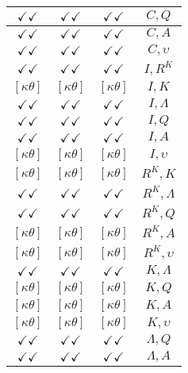 \documentclass[a4paper,10pt]{article}
\begin{document}
\begin{longtable}{|c|c|c|c|}
\hline
$\checkmark\checkmark$ & $\checkmark\checkmark$ & $\checkmark\checkmark$ & ${C},{Q}$ \\
\hline
$\checkmark\checkmark$ & $\checkmark\checkmark$ & $\checkmark\checkmark$ & ${C},{A}$ \\
\hline
$\checkmark\checkmark$ & $\checkmark\checkmark$ & $\checkmark\checkmark$ & ${C},{\upsilon}$ \\
\hline
$\checkmark\checkmark$ & $\checkmark\checkmark$ & $\checkmark\checkmark$ & ${I},{R^{K}}$ \\
\hline
$[\kappa \theta ]$ & $[\kappa \theta ]$ & $[\kappa \theta ]$ & ${I},{K}$ \\
\hline
$\checkmark\checkmark$ & $\checkmark\checkmark$ & $\checkmark\checkmark$ & ${I},{\Lambda}$ \\
\hline
$\checkmark\checkmark$ & $\checkmark\checkmark$ & $\checkmark\checkmark$ & ${I},{Q}$ \\
\hline
$\checkmark\checkmark$ & $\checkmark\checkmark$ & $\checkmark\checkmark$ & ${I},{A}$ \\
\hline
$[\kappa \theta ]$ & $[\kappa \theta ]$ & $[\kappa \theta ]$ & ${I},{\upsilon}$ \\
\hline
$[\kappa \theta ]$ & $[\kappa \theta ]$ & $[\kappa \theta ]$ & ${R^{K}},{K}$ \\
\hline
$\checkmark\checkmark$ & $\checkmark\checkmark$ & $\checkmark\checkmark$ & ${R^{K}},{\Lambda}$ \\
\hline
$\checkmark\checkmark$ & $\checkmark\checkmark$ & $\checkmark\checkmark$ & ${R^{K}},{Q}$ \\
\hline
$[\kappa \theta ]$ & $[\kappa \theta ]$ & $[\kappa \theta ]$ & ${R^{K}},{A}$ \\
\hline
$[\kappa \theta ]$ & $[\kappa \theta ]$ & $[\kappa \theta ]$ & ${R^{K}},{\upsilon}$ \\
\hline
$\checkmark\checkmark$ & $\checkmark\checkmark$ & $\checkmark\checkmark$ & ${K},{\Lambda}$ \\
\hline
$[\kappa \theta ]$ & $[\kappa \theta ]$ & $[\kappa \theta ]$ & ${K},{Q}$ \\
\hline
$[\kappa \theta ]$ & $[\kappa \theta ]$ & $[\kappa \theta ]$ & ${K},{A}$ \\
\hline
$[\kappa \theta ]$ & $[\kappa \theta ]$ & $[\kappa \theta ]$ & ${K},{\upsilon}$ \\
\hline
$\checkmark\checkmark$ & $\checkmark\checkmark$ & $\checkmark\checkmark$ & ${\Lambda},{Q}$ \\
\hline
$\checkmark\checkmark$ & $\checkmark\checkmark$ & $\checkmark\checkmark$ & ${\Lambda},{A}$ \\

\end{longtable}
\end{document}
